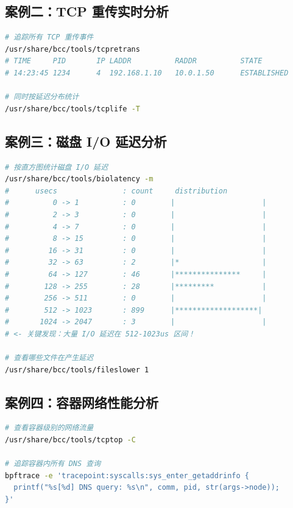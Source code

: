 \documentclass[12pt,UTF8]{ctexbook}
\begin{document}
\subsection*{案例二：TCP 重传实时分析}

\begin{lstlisting}[language=bash]
# 追踪所有 TCP 重传事件
/usr/share/bcc/tools/tcpretrans
# TIME     PID       IP LADDR          RADDR          STATE
# 14:23:45 1234      4  192.168.1.10   10.0.1.50      ESTABLISHED

# 同时按延迟分布统计
/usr/share/bcc/tools/tcplife -T
\end{lstlisting}

\subsection*{案例三：磁盘 I/O 延迟分析}

\begin{lstlisting}[language=bash]
# 按直方图统计磁盘 I/O 延迟
/usr/share/bcc/tools/biolatency -m
#      usecs               : count     distribution
#          0 -> 1          : 0        |                    |
#          2 -> 3          : 0        |                    |
#          4 -> 7          : 0        |                    |
#          8 -> 15         : 0        |                    |
#         16 -> 31         : 0        |                    |
#         32 -> 63         : 2        |*                   |
#         64 -> 127        : 46       |***************     |
#        128 -> 255        : 28       |*********           |
#        256 -> 511        : 0        |                    |
#        512 -> 1023       : 899      |*******************|
#       1024 -> 2047       : 3        |                    |
# <- 关键发现：大量 I/O 延迟在 512-1023us 区间！

# 查看哪些文件在产生延迟
/usr/share/bcc/tools/fileslower 1
\end{lstlisting}

\subsection*{案例四：容器网络性能分析}

\begin{lstlisting}[language=bash]
# 查看容器级别的网络流量
/usr/share/bcc/tools/tcptop -C

# 追踪容器内所有 DNS 查询
bpftrace -e 'tracepoint:syscalls:sys_enter_getaddrinfo {
  printf("%s[%d] DNS query: %s\n", comm, pid, str(args->node));
}'
\end{lstlisting}
\end{document}

